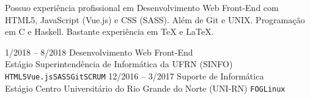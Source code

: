 \documentclass[9pt]{developercv} %
\begin{document}
\begin{minipage}[t]{1\textwidth}
    \vspace{0.05em}
    Possuo experiência profissional em Desenvolvimento Web Front-End com HTML5, JavaScript (Vue.js) e CSS (SASS). Além de Git e UNIX. Programação em C e Haskell. Bastante experiência em \TeX{} e \LaTeX{}.
\end{minipage}

\begin{entrylist}
    \entry
        {1/2018 -- 8/2018}
        {Desenvolvimento Web Front-End\\
            \footnotesize{Estágio}}
        {Superintendência de Informática da UFRN (SINFO)}
        {\texttt{HTML5}\slashsep\texttt{Vue.js}\slashsep\texttt{SASS}\slashsep\texttt{Git}\slashsep\texttt{SCRUM}}
    \entry
        {12/2016 -- 3/2017}
        {Suporte de Informática\\
            \footnotesize{Estágio}}
        {Centro Universitário do Rio Grande do Norte (UNI-RN)}
        {\texttt{FOG}\slashsep\texttt{Linux}}
\end{entrylist}


\end{document}
